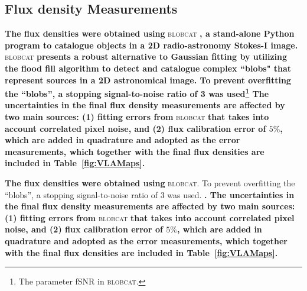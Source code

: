 \documentclass[fleqn,usenatbib]{mnras}
\def\Tab{Table}
\begin{document}
\subsection{Flux density Measurements}


\textbf{The flux densities were obtained using }\textsc{blobcat} \textbf{\citep{Hales2012_paper,Haless12_soft}, a stand-alone Python program to catalogue objects in a 2D radio-astronomy Stokes-I image. }\textsc{blobcat} \textbf{presents a robust alternative to Gaussian fitting by utilizing the flood fill algorithm \citep{magnenat2012computer} to detect and catalogue complex ``blobs" that represent sources in a 2D astronomical image. To prevent overfitting the ``blobs'', a stopping signal-to-noise ratio of 3 was used\footnote{The parameter fSNR in \textsc{blobcat}.} 
The uncertainties in the final flux density measurements are affected by two main sources: (1) fitting errors from }\textsc{blobcat} \textbf{that takes into account correlated pixel noise, and (2) flux calibration error of $5\%$, which are added in quadrature and adopted as the error measurements, which together with the final flux densities are included in \Tab~\ref{fig:VLAMaps}.  }



\textbf{The flux densities were obtained using }\textsc{blobcat}. To prevent overfitting the ``blobs'', a stopping signal-to-noise ratio of 3 was used. \textbf{\citep{Hales2012_paper,Haless12_soft}. The uncertainties in the final flux density measurements are affected by two main sources: (1) fitting errors from }\textsc{blobcat} \textbf{that takes into account correlated pixel noise, and (2) flux calibration error of $5\%$, which are added in quadrature and adopted as the error measurements, which together with the final flux densities are included in \Tab~\ref{fig:VLAMaps}.  }
\end{document}
